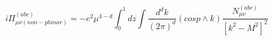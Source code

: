 \begin{equation}
i\Pi_{\mu\nu(non-planar)}^{(abc)}=-e^{2}\mu^{4-d}\int_{0}^{1}dz\int
  \frac{d^{d}k}{(2\pi)^{d}}
  (cosp\wedge k)\frac{\textit{N}_{\mu\nu}^{(abc)}}{[k^{2}-M^{2}]^{2}}
  \end{equation}

